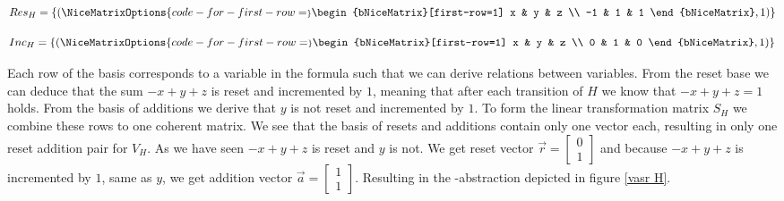 \begin{center}
	\begin{minipage}{0.5\linewidth}
		\begin{equation*}
			Res_H = \{(
			\NiceMatrixOptions{code-for-first-row=\scriptstyle}
			\begin{bNiceMatrix}[first-row=1]
				x & y & z \\
				-1 & 1 & 1 
			\end{bNiceMatrix}, 1)\}
		\end{equation*}
	\end{minipage}
	\begin{minipage}{0.4\linewidth}
		\begin{equation*}
			Inc_H = \{(
			\NiceMatrixOptions{code-for-first-row=\scriptstyle}
			\begin{bNiceMatrix}[first-row=1] 
				x & y & z \\
				0 & 1 & 0 
			\end{bNiceMatrix}, 1)\}
		\end{equation*}
	\end{minipage}
\end{center}
Each row of the basis corresponds to a variable in the formula such that we can derive relations between variables. From the reset base we can deduce that the sum $-x + y + z$ is reset and incremented by $1$, meaning that after each transition of $H$ we know that $-x + y + z = 1$ holds. From the basis of additions we derive that $y$ is not reset and incremented by $1$. To form the linear transformation matrix $S_H$ we combine these rows to one coherent matrix. We see that the basis of resets and additions contain only one vector each, resulting in only one reset addition pair for $V_H$. As we have seen $-x + y + z$ is reset and $y$ is not. We get reset vector $\vec{r} = \begin{bmatrix} 0 \\ 1 \end{bmatrix}$ and because $-x + y + z$ is incremented by $1$, same as $y$, we get addition vector $\vec{a} = \begin{bmatrix} 1 \\ 1 \end{bmatrix}$. Resulting in the \qvasr-abstraction depicted in figure \ref{vasr  H}.
\vspace*{-2em}
